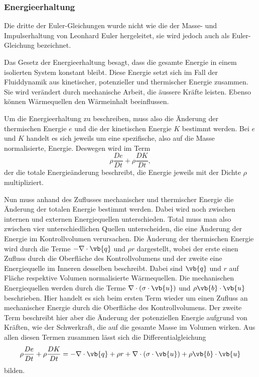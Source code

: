 \subsubsection{Energieerhaltung}
Die dritte der Euler-Gleichungen wurde nicht wie die der Masse- und Impulserhaltung von Leonhard Euler hergeleitet, sie wird jedoch auch als Euler-Gleichung bezeichnet.

Das Gesetz der Energieerhaltung besagt, dass die gesamte Energie in einem isolierten System konstant bleibt.
Diese Energie setzt sich im Fall der Fluiddynamik aus kinetischer, potenzieller und thermischer Energie zusammen.
Sie wird verändert durch mechanische Arbeit, die äussere Kräfte leisten. Ebenso können Wärmequellen den Wärmeinhalt beeinflussen.

Um die Energieerhaltung zu beschreiben, muss also die Änderung der thermischen Energie $e$ und die der kinetischen Energie $K$ bestimmt werden.
Bei $e$ und  $K$ handelt es sich jeweils um eine spezifische, also auf die Masse normalisierte, Energie.
Deswegen wird im Term 
\[\rho \frac{De}{Dt}+  \rho \frac{DK}{Dt},
\]
der die totale Energieänderung beschreibt, die Energie jeweils mit der Dichte $\rho$ multipliziert.

Nun muss anhand des Zuflusses mechanischer und thermischer Energie die Änderung der totalen Energie bestimmt werden.
Dabei wird noch zwischen internen und externen Energiequellen unterschieden.
Total muss man also zwischen vier unterschiedlichen Quellen unterscheiden, die eine Änderung der Energie im Kontrollvolumen verursachen.
Die Änderung der thermischen Energie wird durch die Terme  $- \nabla \cdot \vb{q}$ und  $\rho r$ dargestellt, wobei der erste einen Zufluss durch die Oberfläche des Kontrollvolumens und der zweite eine Energiequelle im Inneren desselben beschreibt.
Dabei sind $\vb{q}$ und $r$ auf Fläche respektive Volumen normalisierte Wärmequellen.
Die mechanischen Energiequellen werden durch die Terme $\nabla \cdot (\sigma \cdot \vb{u})$ und $\rho \vb{b} \cdot \vb{u}$ beschrieben.
Hier handelt es sich beim ersten Term wieder um einen Zufluss an mechanischer Energie durch die Oberfläche des Kontrollvolumens.  Der zweite Term beschreibt hier aber die Änderung der potenziellen Energie aufgrund von Kräften, wie der Schwerkraft, die auf die gesamte Masse im Volumen wirken.
Aus allen diesen Termen zusammen lässt sich die Differentialgleichung
\begin{equation}
\label{openfoam:euler3}
\rho \frac{De}{Dt}+  \rho \frac{DK}{Dt}
=
- \nabla \cdot \vb{q} + \rho r + \nabla \cdot (\sigma \cdot \vb{u}) + \rho \vb{b} \cdot \vb{u} 
\end{equation} 
bilden.

